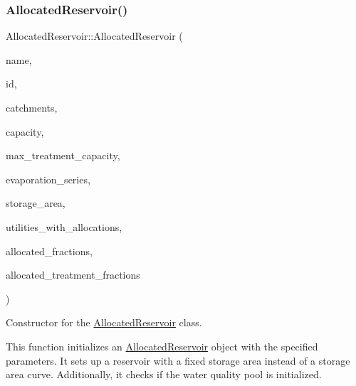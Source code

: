\subsubsection{\texorpdfstring{Allocated\+Reservoir()}{AllocatedReservoir()}\hspace{0.1cm}{\footnotesize\ttfamily [3/5]}}
{\footnotesize\ttfamily Allocated\+Reservoir\+::\+Allocated\+Reservoir (\begin{DoxyParamCaption}\item[{const char $\ast$}]{name,  }\item[{const int}]{id,  }\item[{const vector$<$ \mbox{\hyperlink{classCatchment}{Catchment}} $\ast$$>$ \&}]{catchments,  }\item[{const double}]{capacity,  }\item[{const double}]{max\+\_\+treatment\+\_\+capacity,  }\item[{Evaporation\+Series \&}]{evaporation\+\_\+series,  }\item[{double}]{storage\+\_\+area,  }\item[{vector$<$ int $>$ $\ast$}]{utilities\+\_\+with\+\_\+allocations,  }\item[{vector$<$ double $>$ $\ast$}]{allocated\+\_\+fractions,  }\item[{vector$<$ double $>$ $\ast$}]{allocated\+\_\+treatment\+\_\+fractions }\end{DoxyParamCaption})}



Constructor for the \mbox{\hyperlink{classAllocatedReservoir}{Allocated\+Reservoir}} class. 

This function initializes an \mbox{\hyperlink{classAllocatedReservoir}{Allocated\+Reservoir}} object with the specified parameters. It sets up a reservoir with a fixed storage area instead of a storage area curve. Additionally, it checks if the water quality pool is initialized.


